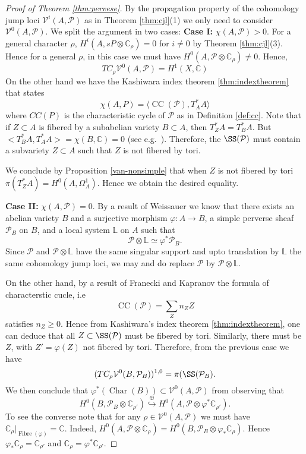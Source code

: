 \documentclass[12pt,reqno]{amsart}
\theoremstyle{question}
\theoremstyle{definition}
\theoremstyle{remark}
\theoremstyle{cited}
\theoremstyle{citeddef}
\DeclareMathOperator{\Char}{Char}
\DeclareMathOperator{\CC}{CC}
\newcommand{\sP}{\mathcal{P}}
\newcommand\sV{{\mathcal V}}
\newcommand{\bbC}{\mathbb{C}}
\newcommand{\bbL}{\mathbb{L}}
\newcommand{\into}{\hookrightarrow}
\begin{document}
\begin{proof}[Proof of Theorem \ref{thm:pervese}]
By the propagation property of the cohomology jump loci
$\sV^i(A, \sP)$ as in Theorem \ref{thm:cjl}(1) we
only need to consider $\sV^0(A,\sP)$. We split the argument in 
two cases:
\noindent \textbf{Case I: }$\chi(A, \sP)>0$. 
For a general character $\rho$, $H^i(A, sP\otimes \bbC_{\rho})= 0$ for $i\neq 0$ by Theorem \ref{thm:cjl}(3). Hence for a general
$\rho$,
in this case we must have $H^0(A, \sP\otimes \bbC_{\rho})\neq 0$. Hence, 
\[TC_{\rho}\sV^0(A, \sP) = H^1(X,\bbC)\]
On the other hand we have
the Kashiwara index theorem \ref{thm:indextheorem}
that states
\[\chi(A,P) = \langle \CC(\sP), T^*_AA\rangle\]
where $CC(P)$ is the characteristic cycle of $\sP$ as
in Definition \ref{def:cc}.
Note that if $Z\subset A$ is fibered by a subabelian variety $B\subset A$, then $T^*_ZA = T^*_BA$. But $<T^*_BA, T^*_AA> = \chi(B, \bbC) = 0$ (see e.g.\ \cite[p.\ 124]{Dim}).  Therefore,
the $\SS(\sP)$ must contain a subvariety $Z\subset A$ such that
$Z$ is not fibered by tori. 

We conclude by Proposition \ref{van-nonsimple} that when $Z$ is not fibered by tori $\pi(T^*_ZA) = H^0(A,\Omega_A^1)$. Hence
we obtain the desired equality.

\noindent \textbf{Case II: } $\chi(A, \sP)=0$. 
By a result of Weissauer \cite[Theorem 2]{Wei}
we know that there exists an abelian variety $B$ and a surjective morphism $\varphi\colon A\to B$, a simple perverse sheaf $\sP_B$ on $B$, and a local system $\bbL$ on $A$
such that 
\[\sP\otimes \bbL\simeq \varphi^*\sP_B.\]
Since $\sP$ and $\sP\otimes \bbL$ have the same singular support
and upto translation by $\bbL$ the same cohomology jump loci, we 
may and do replace $\sP$ by $\sP\otimes \bbL$.

On the other hand, by a result of
Franecki and Kapranov
\cite[Corollary 1.4]{FK} the formula of
characterstic cucle, i.e\ \[\CC(\sP) = \sum_Z n_Z Z\]
satisfies $n_Z\geq 0$. Hence from Kashiwara's index theorem 
\ref{thm:indextheorem}, one can deduce that all $Z\subset \SS(\sP)$ must be fibered by tori. Similarly, there must be 
$Z$, with $Z' = \varphi(Z)$ not fibered by tori.
Therefore, from the previous case we have 
\[(TC_{\rho}\sV^0(B, \sP_B))^{1,0} = \pi(\SS(\sP_B).\]
We then conclude 
that $\varphi^*(\Char(B))\subset \sV^0(A, \sP)$ from observing that
\[H^0(B, \sP_B\otimes \bbC_{\rho'}) \overset{\oplus}{\into}
H^0(A, \sP\otimes \varphi^*\bbC_{\rho'}).\]
To see the converse note that 
for any $\rho \in \sV^0(A, \sP)$ we must 
have $\bbC_{\rho}|_{\operatorname{Fibre}(\varphi)} = \bbC$.
Indeed, $H^0(A, \sP\otimes \bbC_{\rho}) = H^0(B, \sP_B\otimes \varphi_*\bbC_{\rho})$.
Hence $\varphi_*\bbC_{\rho} = \bbC_{\rho'}$ and $\bbC_{\rho} = 
\varphi^*\bbC_{\rho'}$.







\end{proof}
\end{document}
